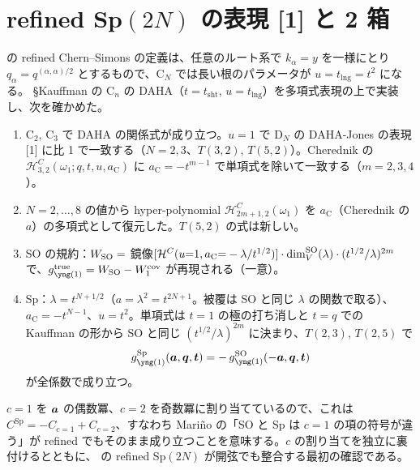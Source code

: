 \section{refined Sp$(2N)$ の表現 [1] と 2 箱}\label{sec:sp}
\cite{AM22} の refined Chern--Simons の定義は、任意のルート系で $k_\alpha = y$ を一様にとり $q_\alpha = q^{(\alpha,\alpha)/2}$ とするもので、C$_N$ では長い根のパラメータが $u = t_{\mathrm{lng}} = t^2$ になる。
\cite{Cherednik11} §Kauffman の C$_n$ の DAHA（$t = t_{\mathrm{sht}}$, $u = t_{\mathrm{lng}}$）を多項式表現の上で実装し、次を確かめた。
\begin{compresult}
\begin{enumerate}
\item C$_2$, C$_3$ で DAHA の関係式が成り立つ。$u = 1$ で D$_N$ の DAHA-Jones の表現 [1] に比 1 で一致する（$N = 2, 3$、$T(3,2)$, $T(5,2)$）。Cherednik の $\mathcal{H}^C_{3,2}(\omega_1; q, t, u, a_{\mathrm{C}})$ に $a_{\mathrm{C}} = -t^{m-1}$ で単項式を除いて一致する（$m = 2, 3, 4$）。
\item $N = 2, \dots, 8$ の値から hyper-polynomial $\mathcal{H}^C_{2m+1,2}(\omega_1)$ を $a_{\mathrm{C}}$（Cherednik の $a$）の多項式として復元した。$T(5,2)$ の式は新しい。
\item SO の規約：$W_{\mathrm{SO}} = $ 鏡像$[\mathcal{H}^C(u{=}1, a_{\mathrm{C}}{=}-\lambda/t^{1/2})]\cdot\dim_V^{\mathrm{SO}}(\lambda)\cdot(t^{1/2}/\lambda)^{2m}$ で、$g^{\mathrm{true}}_{\yone} = W_{\SO} - W^{\cov}_1$ が再現される（一意）。
\item Sp：$\lambda = t^{N+1/2}$（$a = \lambda^2 = t^{2N+1}$。被覆は SO と同じ $\lambda$ の関数で取る）、$a_{\mathrm{C}} = -t^{N-1}$、$u = t^2$。単項式は $t = 1$ の極の打ち消しと $t = q$ での Kauffman の形から SO と同じ $(t^{1/2}/\lambda)^{2m}$ に決まり、$T(2,3)$, $T(2,5)$ で
\[
g^{\mathrm{Sp}}_{\yone}(\ba, \bq, \bt) = -\,g^{\SO}_{\yone}(-\ba, \bq, \bt)
\]
が全係数で成り立つ。
\end{enumerate}
\end{compresult}
$c = 1$ を $\bm{a}$ の偶数冪、$c = 2$ を奇数冪に割り当てているので、これは $C^{\mathrm{Sp}} = -C_{c=1} + C_{c=2}$、すなわち Mariño の「SO と Sp は $c = 1$ の項の符号が違う」が refined でもそのまま成り立つことを意味する。$c$ の割り当てを独立に裏付けるとともに、\cite{AM22} の refined Sp$(2N)$ が開弦でも整合する最初の確認である。

